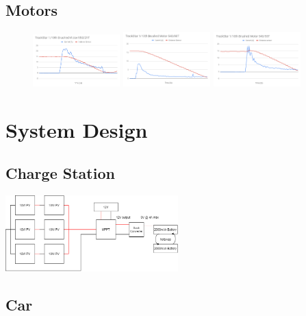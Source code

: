 \documentclass[11pt]{article}
\begin{document}
\subsection{Motors}

\begin{figure}[h!]
    \begin{center}
        \includegraphics[width=0.3\textwidth]{inc/large_motor.png}
        \includegraphics[width=0.3\textwidth]{inc/slow_motor.png}
        \includegraphics[width=0.3\textwidth]{inc/small_motor.png}
    \end{center}
\end{figure}

\section{System Design}
\subsection{Charge Station}

\begin{center}
    \includegraphics[width=0.5\textwidth]{inc/panels.png}
\end{center}

\subsection{Car}
\end{document}
